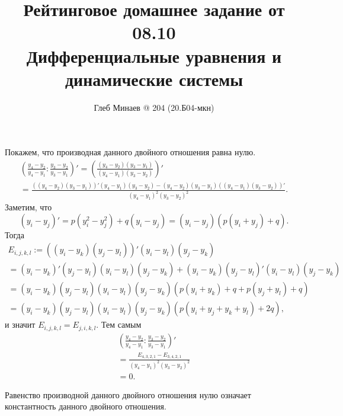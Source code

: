 \documentclass[12pt,a4paper]{article}
\title{Рейтинговое домашнее задание от 08.10\\Дифференциальные уравнения и динамические системы}
\author{Глеб Минаев @ 204 (20.Б04-мкн)}
\date{}
\begin{document}
    \maketitle

    \begin{problem}{5}
        Покажем, что производная данного двойного отношения равна нулю.
        \begin{gather*}
            \left(\frac{y_4 - y_2}{y_4 - y_1} : \frac{y_3 - y_2}{y_3 - y_1}\right)'
            = \left(\frac{(y_4 - y_2)(y_3 - y_1)}{(y_4 - y_1)(y_3 - y_2)}\right)'\\
            = \frac{((y_4 - y_2)(y_3 - y_1))' (y_4 - y_1)(y_3 - y_2) - (y_4 - y_2)(y_3 - y_1) ((y_4 - y_1)(y_3 - y_2))'}{(y_4 - y_1)^2(y_3 - y_2)^2}.
        \end{gather*}
        Заметим, что
        \[
            (y_i - y_j)'
            = p (y_i^2 - y_j^2) + q (y_i - y_j)
            = (y_i - y_j) (p(y_i + y_j) + q).
        \]
        Тогда
        \begin{gather*}
            E_{i, j, k, l} := ((y_i - y_k)(y_j - y_l))' (y_i - y_l)(y_j - y_k)\\
            = (y_i - y_k)' (y_j - y_l)(y_i - y_l)(y_j - y_k) + (y_i - y_k)(y_j - y_l)' (y_i - y_l)(y_j - y_k)\\
            = (y_i - y_k)(y_j - y_l)(y_i - y_l)(y_j - y_k)(p(y_i + y_k) + q + p(y_j + y_l) + q)\\
            = (y_i - y_k)(y_j - y_l)(y_i - y_l)(y_j - y_k)(p(y_i + y_j + y_k + y_l) + 2q),
        \end{gather*}
        и значит $E_{i, j, k, l} = E_{j, i, k, l}$. Тем самым
        \begin{gather*}
            \left(\frac{y_4 - y_2}{y_4 - y_1} : \frac{y_3 - y_2}{y_3 - y_1}\right)'\\
            = \frac{E_{4, 3, 2, 1} - E_{3, 4, 2, 1}}{(y_4 - y_1)^2(y_3 - y_2)^2}\\
            = 0.
        \end{gather*}

        Равенство производной данного двойного отношения нулю означает константность данного двойного отношения.
    \end{problem}
\end{document}
